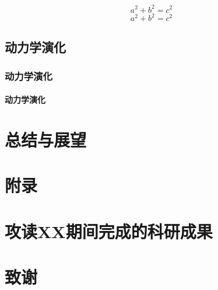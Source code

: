 \documentclass[type=master]{YNUthesis} %
\begin{document}
\zhlipsum

\[
	a^2+b^2=c^2
\]
\zhlipsum
\begin{equation}
	a^2+b^2=c^2
\end{equation}

\zhlipsum

\section{动力学演化}
\zhlipsum

\subsection{动力学演化}
\zhlipsum

\subsubsection{动力学演化}
\zhlipsum

\chapter{总结与展望}
\zhlipsum

\appendix
\chapter{附录}
\zhlipsum

\backmatter

\printbibliography

\chapter{攻读XX期间完成的科研成果}
\zhlipsum

\chapter{致谢}
\zhlipsum
\end{document}
